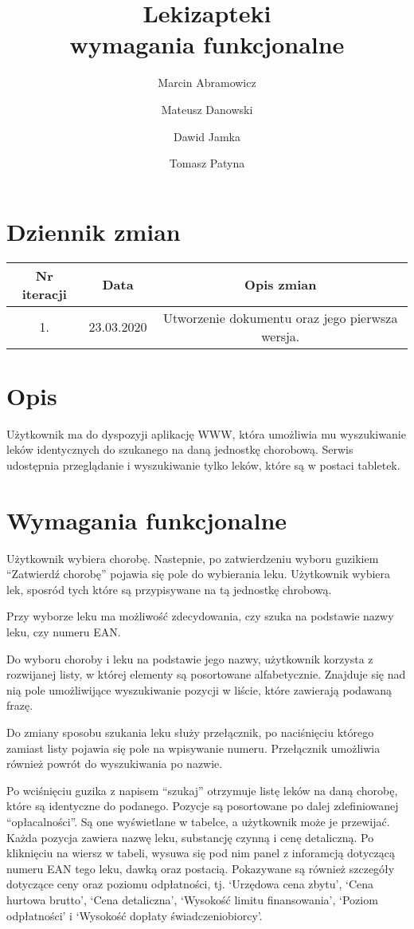 \documentclass{article}
\title{
Lekizapteki\\
\large wymagania funkcjonalne}
\author{Marcin Abramowicz \and Mateusz Danowski \and Dawid Jamka \and Tomasz Patyna}
\begin{document}
  \maketitle

  \section{Dziennik zmian}
  \begin{tabular}{|c|c|c|}
    Nr iteracji & Data & Opis zmian \\
    \hline
    1. & 23.03.2020 & Utworzenie dokumentu oraz jego pierwsza wersja. \\
  \end{tabular}

  \section{Opis}
  Użytkownik ma do dyspozyji aplikację WWW, która umożliwia mu wyszukiwanie leków identycznych do szukanego na daną jednostkę chorobową.
  Serwis udostępnia przeglądanie i wyszukiwanie tylko leków, które są w postaci tabletek.

  \section{Wymagania funkcjonalne}
  Użytkownik wybiera chorobę.
  Nastepnie, po zatwierdzeniu wyboru guzikiem ``Zatwierdź chorobę'' pojawia się pole do wybierania leku.
  Użytkownik wybiera lek, sposród tych które są przypisywane na tą jednostkę chrobową.

  Przy wyborze leku ma możliwość zdecydowania, czy szuka na podstawie nazwy leku, czy numeru EAN.

  Do wyboru choroby i leku na podstawie jego nazwy, użytkownik korzysta z rozwijanej listy, w której elementy są posortowane alfabetycznie.
  Znajduje się nad nią pole umożliwijące wyszukiwanie pozycji w liście, które zawierają podawaną frazę.

  Do zmiany sposobu szukania leku służy przełącznik, po naciśnięciu którego zamiast listy pojawia się pole na wpisywanie numeru.
  Przełącznik umożliwia również powrót do wyszukiwania po nazwie.

  Po wciśnięciu guzika z napisem ``szukaj'' otrzymuje listę leków na daną chorobę, które są identyczne do podanego.
  Pozycje są posortowane po dalej zdefiniowanej ``opłacalności''.
  Są one wyświetlane w tabelce, a użytkownik może je przewijać.
  Każda pozycja zawiera nazwę leku, substancję czynną i cenę detaliczną.
  Po kliknięciu na wiersz w tabeli, wysuwa się pod nim panel z inforamcją dotyczącą numeru EAN tego leku, dawką oraz postacią.
  Pokazywane są również szczegóły dotyczące ceny oraz poziomu odpłatności, tj.
  `Urzędowa cena zbytu',
  `Cena hurtowa brutto',
  `Cena detaliczna',
  `Wysokość limitu finansowania',
  `Poziom odpłatności' i
  `Wysokość dopłaty świadczeniobiorcy'.
\end{document}
